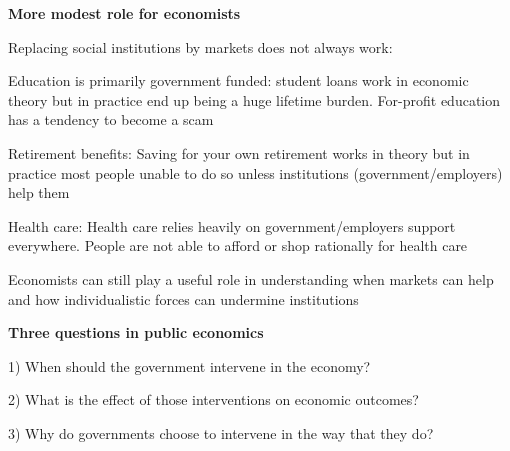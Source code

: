 \documentclass[landscape]{slides}
\begin{document}
\begin{slide}
\begin{center}
{\bf More modest role for economists}
\end{center}
Replacing social institutions by markets does not always work:

Education is primarily government funded: student loans work in economic theory but in practice end up being a huge lifetime burden.
For-profit education has a tendency to become a scam

Retirement benefits: Saving for your own retirement works in theory but in practice most people unable to do so unless institutions (government/employers) help them 

Health care: Health care relies heavily on government/employers support everywhere. People are not able to afford or shop rationally for health care 

Economists can still play a useful role in understanding when markets can help and how individualistic forces can undermine institutions

\end{slide}





%
%
%


\begin{slide}
\begin{center}
{\bf Three questions in public economics}
\end{center}

1) When should the government intervene in the economy?


2) What is the effect of those interventions on economic outcomes?

3) Why do governments choose to intervene in the way that they do?

\end{slide}
\end{document}
